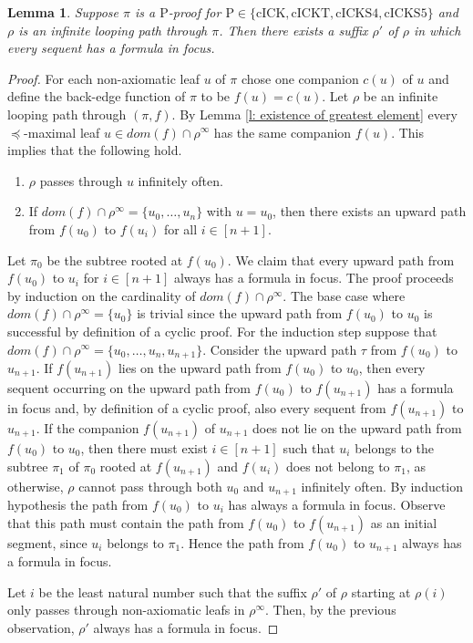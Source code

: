 \documentclass{myifcolog}
\newcommand{\hickp}{\mathrm{P}}
\newcommand{\cick}{\mathrm{cICK}}
\newcommand{\cickt}{\mathrm{cICKT}}
\newcommand{\cicks}{\mathrm{cICKS4}}
\newcommand{\cickss}{\mathrm{cICKS5}}
\newtheorem{lemma}[theorem]{Lemma}
\numberwithin{theorem}{section}
\begin{document}
     \begin{lemma}\label{l: infinite looping path has good suffix}
         Suppose $\pi$ is a $\hickp$-proof for $\hickp \in \{\cick, \cickt, \cicks, \cickss\}$ and $\rho$ is an infinite looping path through $\pi$. Then there exists a suffix $\rho'$ of $\rho$ in which every sequent has a formula in focus.
     \end{lemma}
     \begin{proof}
         For each non-axiomatic leaf $u$ of $\pi$ chose one companion $c(u)$ of $u$ and define the back-edge function of $\pi$ to be $f(u) = c(u)$. Let $\rho$ be an infinite looping path through $(\pi, f)$. By Lemma \ref{l: existence of greatest element} every $\preceq$-maximal leaf $u \in dom(f) \cap \rho^\infty$ has the same companion $f(u)$. This implies that the following hold.
         \begin{enumerate}
             \item $\rho$ passes through $u$ infinitely often.
             \item If $dom(f) \cap \rho^{\infty} = \{u_0, \ldots, u_n\}$ with $u=u_0$, then there exists an upward path from $f(u_0)$ to $f(u_i)$ for all $i \in [n+1]$.
         \end{enumerate}
         Let $\pi_0$ be the subtree rooted at $f(u_0)$. We claim that every upward path from $f(u_0)$ to $u_i$ for ${i \in [n+1]}$ always has a formula in focus. The proof proceeds by induction on the cardinality of ${dom(f) \cap \rho^{\infty}}$. The base case where $dom(f) \cap \rho^{\infty} = \{u_0\}$ is trivial since the upward path from $f(u_0)$ to $u_0$ is successful by definition of a cyclic proof. For the induction step suppose that $dom(f) \cap \rho^{\infty} = \{u_0, \ldots, u_n, u_{n+1}\}$. Consider the upward path $\tau$ from $f(u_0)$ to $u_{n+1}$. If $f(u_{n+1})$ lies on the upward path from $f(u_0)$ to $u_0$, then every sequent occurring on the upward path from $f(u_0)$ to $f(u_{n+1})$ has a formula in focus and, by definition of a cyclic proof, also every sequent from $f(u_{n+1})$ to $u_{n+1}$. If the companion $f(u_{n+1})$ of $u_{n+1}$ does not lie on the upward path from $f(u_0)$ to $u_0$, then there must exist $i \in [n+1]$ such that $u_i$ belongs to the subtree $\pi_1$ of $\pi_0$ rooted at $f(u_{n+1})$ and $f(u_i)$ does not belong to $\pi_1$, as otherwise, $\rho$ cannot pass through both $u_0$ and $u_{n+1}$ infinitely often. By induction hypothesis the path from $f(u_0)$ to $u_i$ has always a formula in focus. Observe that this path must contain the path from $f(u_0)$ to $f(u_{n+1})$ as an initial segment, since $u_i$ belongs to $\pi_1$. Hence the path from $f(u_0)$ to $u_{n+1}$ always has a formula in focus.

         Let $i$ be the least natural number such that the suffix $\rho'$ of $\rho$ starting at $\rho(i)$ only passes through non-axiomatic leafs in $\rho^{\infty}$. Then, by the previous observation, $\rho'$ always has a formula in focus.
     \end{proof}
\end{document}
